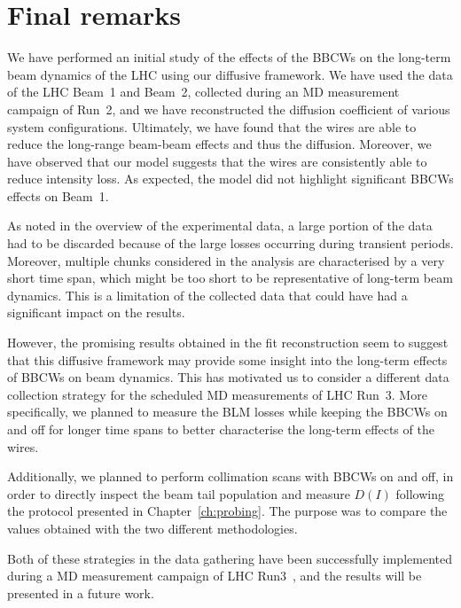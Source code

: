 
\section{Final remarks}\label{sec:5:conclusions}

We have performed an initial study of the effects of the BBCWs on the long-term beam dynamics of the LHC using our diffusive framework. We have used the data of the LHC Beam~1 and Beam~2, collected during an MD measurement campaign of Run~2, and we have reconstructed the diffusion coefficient of various system configurations. Ultimately, we have found that the wires are able to reduce the long-range beam-beam effects and thus the diffusion. Moreover, we have observed that our model suggests that the wires are consistently able to reduce intensity loss. As expected, the model did not highlight significant BBCWs effects on Beam~1.

As noted in the overview of the experimental data, a large portion of the data had to be discarded because of the large losses occurring during transient periods. Moreover, multiple chunks considered in the analysis are characterised by a very short time span, which might be too short to be representative of long-term beam dynamics. This is a limitation of the collected data that could have had a significant impact on the results.

However, the promising results obtained in the fit reconstruction seem to suggest that this diffusive framework may provide some insight into the long-term effects of BBCWs on beam dynamics. This has motivated us to consider a different data collection strategy for the scheduled MD measurements of LHC Run~3. More specifically, we planned to measure the BLM losses while keeping the BBCWs on and off for longer time spans to better characterise the long-term effects of the wires.

Additionally, we planned to perform collimation scans with BBCWs on and off, in order to directly inspect the beam tail population and measure $D(I)$ following the protocol presented in Chapter~\ref{ch:probing}. The purpose was to compare the values obtained with the two different methodologies.

Both of these strategies in the data gathering have been successfully implemented during a MD measurement campaign of LHC Run3~\cite{MDrun3wires}, and the results will be presented in a future work.